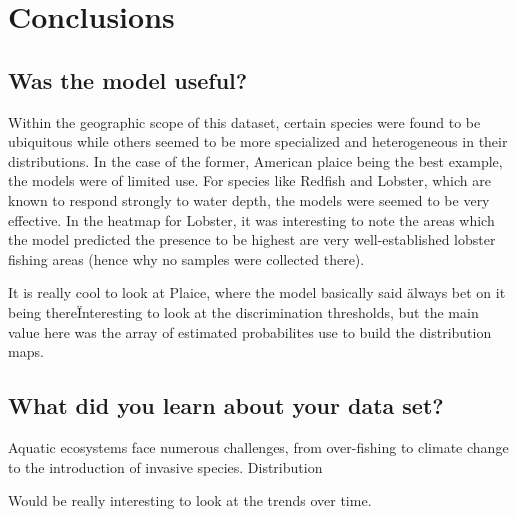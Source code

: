 \section{Conclusions}

\subsection{Was the model useful?}

Within the geographic scope of this dataset, certain species were found to be ubiquitous while others seemed to be more specialized and heterogeneous in their distributions.
In the case of the former, American plaice being the best example, the models were of limited use.
For species like Redfish and Lobster, which are known to respond strongly to water depth, the models were seemed to be very effective.
In the heatmap for Lobster, it was interesting to note the areas which the model predicted the presence to be highest are
very well-established lobster fishing areas (hence why no samples were collected there).


It is really cool to look at Plaice, where the model basically said \"always bet on it being there\"


Interesting to look at the discrimination thresholds, but the main value here was the array of estimated probabilites use to build the distribution maps.

\subsection{What did you learn about your data set?}

Aquatic ecosystems face numerous challenges, from over-fishing to climate change to the introduction of invasive species.
Distribution



Would be really interesting to look at the trends over time.
